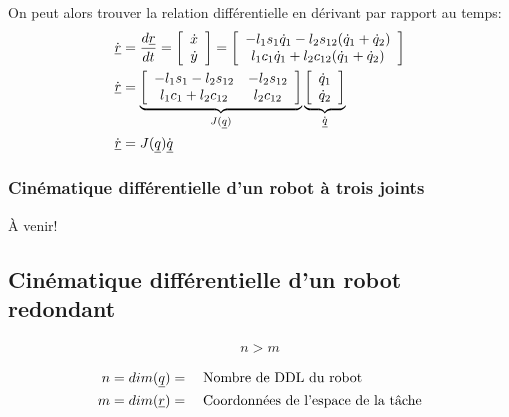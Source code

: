 On peut alors trouver la relation différentielle en dérivant par rapport au temps:
\begin{align}
\dot{\underline{r}} &= \frac{d\underline{r}}{dt} = \left[ \begin{array}{c} \dot{x} \\ \dot{y}  \end{array} \right]  = \left[ \begin{array}{c} 
-l_1 s_1 \dot{q}_1 - l_2 s_{12}( \dot{q}_1 + \dot{q}_2 ) \\ 
 l_1 c_1 \dot{q}_1 + l_2 c_{12}( \dot{q}_1 + \dot{q}_2 )  
\end{array} \right] \\
\dot{\underline{r}}  &= 
\underbrace{ \left[ \begin{array}{c c } 
-l_1 s_1 - l_2 s_{12} & - l_2 s_{12} \\ 
 l_1 c_1 + l_2 c_{12} &   l_2 c_{12}
\end{array} \right]  }_{ J(\underline{q}) } 
\underbrace{ \left[ \begin{array}{c} 
\dot{q}_1 \\ 
\dot{q}_2 
\end{array} \right]}_{ \dot{\underline{q}} } \\
\dot{\underline{r}}  &= J(\underline{q}) \dot{\underline{q}}
\end{align} 




\subsubsection{Cinématique différentielle d'un robot à trois joints}

À venir!


\subsection{Cinématique différentielle d'un robot redondant}

\begin{align}
n > m
\end{align} 

\begin{align}
n &= dim(\underline{q}) = \quad\text{Nombre de DDL du robot} \\
m &= dim(\underline{r}) = \quad\text{Coordonnées de l'espace de la tâche} 
\end{align} 

